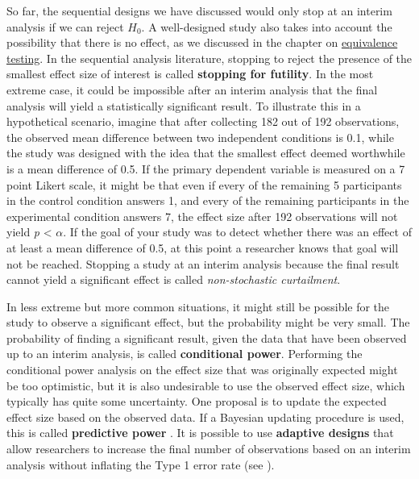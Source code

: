 \documentclass[
  oneside]{krantz}
\begin{document}
So far, the sequential designs we have discussed would only stop at an interim analysis if we can reject \(H_0\). A well-designed study also takes into account the possibility that there is no effect, as we discussed in the chapter on \protect\hyperlink{equivalencetest}{equivalence testing}. In the sequential analysis literature, stopping to reject the presence of the smallest effect size of interest is called \textbf{stopping for futility}. In the most extreme case, it could be impossible after an interim analysis that the final analysis will yield a statistically significant result. To illustrate this in a hypothetical scenario, imagine that after collecting 182 out of 192 observations, the observed mean difference between two independent conditions is 0.1, while the study was designed with the idea that the smallest effect deemed worthwhile is a mean difference of 0.5. If the primary dependent variable is measured on a 7 point Likert scale, it might be that even if every of the remaining 5 participants in the control condition answers 1, and every of the remaining participants in the experimental condition answers 7, the effect size after 192 observations will not yield \emph{p} \textless{} \(\alpha\). If the goal of your study was to detect whether there was an effect of at least a mean difference of 0.5, at this point a researcher knows that goal will not be reached. Stopping a study at an interim analysis because the final result cannot yield a significant effect is called \emph{non-stochastic curtailment}.

In less extreme but more common situations, it might still be possible for the study to observe a significant effect, but the probability might be very small. The probability of finding a significant result, given the data that have been observed up to an interim analysis, is called \textbf{conditional power}. Performing the conditional power analysis on the effect size that was originally expected might be too optimistic, but it is also undesirable to use the observed effect size, which typically has quite some uncertainty. One proposal is to update the expected effect size based on the observed data. If a Bayesian updating procedure is used, this is called \textbf{predictive power} \citep{spiegelhalter_monitoring_1986}. It is possible to use \textbf{adaptive designs} that allow researchers to increase the final number of observations based on an interim analysis without inflating the Type 1 error rate (see \citet{wassmer_group_2016}).
\end{document}
